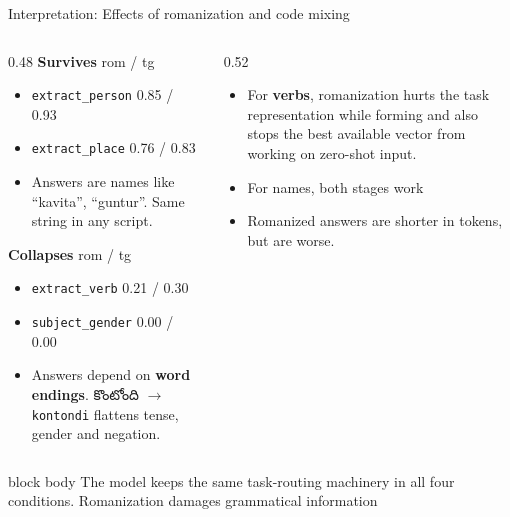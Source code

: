 \documentclass[aspectratio=169,11pt]{beamer}
\newcommand{\telugufont}{}
\newcommand{\tight}{\setlength{\itemsep}{2pt plus 1pt minus 1pt}}
\newcommand{\bridge}[1]{%
  \vspace{1mm}
  \begin{beamercolorbox}[wd=\textwidth,sep=2mm,rounded=true]{block body}%
    \color{black!80}\small #1
  \end{beamercolorbox}}
\newcommand{\tel}[1]{{\telugufont #1}}
\begin{document}
\begin{frame}{Interpretation: Effects of romanization and code mixing}
  \begin{columns}[T]
    \begin{column}{0.48\textwidth}
      \textbf{Survives} \hfill {\footnotesize rom / tg}
      \begin{itemize}\footnotesize\tight
        \item \texttt{extract\_person} \hfill 0.85 / 0.93
        \item \texttt{extract\_place}  \hfill 0.76 / 0.83
        \vspace{1mm}
        \item Answers are names like ``kavita'', ``guntur''.
              Same string in any script.
      \end{itemize}
      \vspace{3mm}
      \textbf{Collapses} \hfill {\footnotesize rom / tg}
      \begin{itemize}\footnotesize\tight
        \item \texttt{extract\_verb}    \hfill 0.21 / 0.30
        \item \texttt{subject\_gender}  \hfill 0.00 / 0.00
        \vspace{1mm}
        \item Answers depend on \textbf{word endings}.
              \tel{కొంటోంది} $\to$ \texttt{kontondi} flattens tense,
              gender and negation.
      \end{itemize}
    \end{column}
    \begin{column}{0.52\textwidth}
      \vspace{2mm}
      \begin{itemize}\small\tight
        \item For \textbf{verbs}, romanization hurts the task representation
              while forming and also stops the best available vector from
              working on zero-shot input.
        \vspace{1mm}
        \item For names, both stages work
        \vspace{1mm}
        \item Romanized answers are shorter in tokens, but are worse.
      \end{itemize}
    \end{column}
  \end{columns}
  \bridge{The model keeps the same task-routing machinery in all four
    conditions. Romanization damages grammatical information}
\end{frame}
\end{document}
